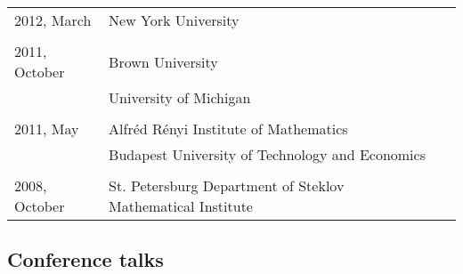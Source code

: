 \documentclass[letterpaper,11pt]{article}
\begin{document}
\begin{longtable}{llc}
	2012, March & New York University\\\\

	2011, October & Brown University \\
	&University of Michigan
	\\
	\\
	2011, May& Alfr\'ed R\'enyi Institute of Mathematics
	\\
	& Budapest University of Technology and Economics
	\\\\

	2008, October &
	St. Petersburg Department of Steklov Mathematical
	Institute%
	\\
\end{longtable}
\bigskip



\subsection*{Conference talks}
\end{document}
